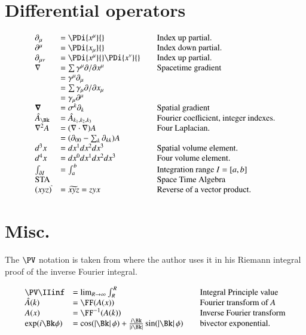 \section{Differential operators}
\begin{equation*}
\begin{array}{l l l}
\partial_{\mu} &= \PDi{x^\mu}{} & \quad \mbox{Index up partial.} \\
\partial^{\mu} &= \PDi{x_\mu}{} & \quad \mbox{Index down partial.} \\
\partial_{\mu\nu} &= \PDi{x^\mu}{}\PDi{x^\nu}{} & \quad \mbox{Index up partial.} \\
\grad &= \sum \gamma^{\mu} \partial/\partial {x^{\mu}} & \quad \mbox{Spacetime gradient} \\
      &= \gamma^{\mu}\partial_{\mu} \\
      &= \sum \gamma_{\mu} \partial/\partial {x_{\mu}} \\
      &= \gamma_{\mu}\partial^{\mu} \\
\spacegrad &= \sigma^{k} \partial_k & \quad \mbox{Spatial gradient} \\
\hat{A}_{\Bk} &= \hat{A}_{k_1,k_2,k_3} & \quad \mbox{Fourier coefficient, integer indexes.} \\
\grad^2 A
   &= (\grad \cdot \grad) A & \quad \mbox{Four Laplacian. } \\
   &= (\partial_{00} - \sum_k \partial_{kk}) A & \\
d^3 x &= dx^1 dx^2 dx^3 & \quad \mbox{Spatial volume element. } \\
d^4 x &= dx^0 dx^1 dx^2 dx^3 & \quad \mbox{Four volume element. } \\
\int_{\partial I} &= \int_{a}^{b} & \quad \mbox{Integration range $I = [a,b]$ } \\
\text{STA} & & \quad \mbox{Space Time Algebra} \\
(xyz)^{\tilde{}} &= \widetilde{xyz} = z y x & \quad \mbox{Reverse of a vector product.} \\
\end{array}
\end{equation*}

\section{Misc.}

The $\PV$ notation is taken from \citep{lepage1980cva} where the author uses it in his Riemann integral proof of the inverse Fourier integral.

\begin{equation*}
\begin{array}{l l l}
\PV \IIinf &= \lim_{R\rightarrow \infty} \int_{R}^R & \quad \mbox{Integral Principle value} \\
\hat{A}(k) &= \FF(A(x)) & \quad \mbox{Fourier transform of $A$} \\
{A}(x) &= \FF^{-1}(A(k)) & \quad \mbox{Inverse Fourier transform} \\
\exp(i\Bk\phi) &=
\cos(\Abs{\Bk}\phi) + \frac{i \Bk}{\Abs{i\Bk}} \sin(\Abs{\Bk}\phi) & \quad \mbox{bivector exponential. } \\
\end{array}
\end{equation*}
